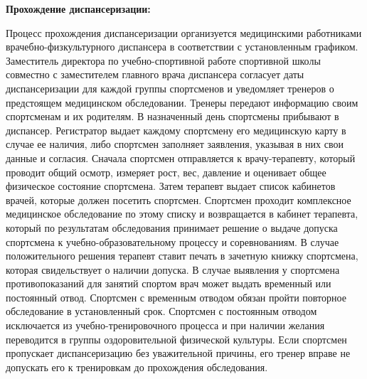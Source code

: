 \documentclass[12pt,a4paper,final]{article} %
\begin{document}
\par \textbf{Прохождение диспансеризации:}
\par Процесс прохождения диспансеризации организуется медицинскими работниками врачебно-физкультурного диспансера в соответствии с установленным графиком. Заместитель директора по учебно-спортивной работе спортивной школы совместно с заместителем главного врача диспансера согласует даты диспансеризации для каждой группы спортсменов и уведомляет тренеров о предстоящем медицинском обследовании. Тренеры передают информацию своим спортсменам и их родителям. В назначенный день спортсмены прибывают в диспансер. Регистратор выдает каждому спортсмену его медицинскую карту в случае ее наличия, либо спортсмен заполняет заявления, указывая в них свои данные и согласия. Сначала спортсмен отправляется к врачу-терапевту, который проводит общий осмотр, измеряет рост, вес, давление и оценивает общее физическое состояние спортсмена. Затем терапевт выдает список кабинетов врачей, которые должен посетить спортсмен. Спортсмен проходит комплексное медицинское обследование по этому списку и возвращается в кабинет терапевта, который по результатам обследования принимает решение о выдаче допуска спортсмена к учебно-образовательному процессу и соревнованиям. В случае положительного решения терапевт ставит печать в зачетную книжку спортсмена, которая свидельствует о наличии допуска. В случае выявления у спортсмена противопоказаний для занятий спортом врач может выдать временный или постоянный отвод. Спортсмен с временным отводом обязан пройти повторное обследование в установленный срок. Спортсмен с постоянным отводом исключается из учебно-тренировочного процесса и при наличии желания переводится в группы оздоровительной физической культуры. Если спортсмен пропускает диспансеризацию без уважительной причины, его тренер вправе не допускать его к тренировкам до прохождения обследования. \\
\end{document}
